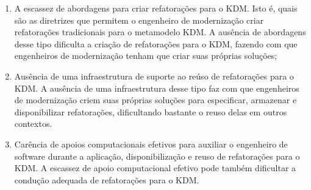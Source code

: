 \begin{enumerate}

\item A escassez de abordagens para criar refatorações para o KDM. Isto é, quais são as diretrizes que permitem o engenheiro de modernização criar refatorações tradicionais para o metamodelo KDM. A ausência de abordagens desse tipo dificulta a criação de refatorações para o KDM, fazendo com que engenheiros de modernização tenham que criar suas próprias soluções;

\item Ausência de uma infraestrutura de suporte ao reúso de refatorações para o KDM. A ausência de uma infraestrutura desse tipo faz com que engenheiros de modernização criem suas próprias soluções para especificar, armazenar e disponibilizar refatorações, dificultando bastante o reuso delas em outros contextos. 






\item Carência de apoios computacionais efetivos para auxiliar o engenheiro de software durante a aplicação, disponibilização e reuso de refatorações para o KDM. A escassez de apoio computacional efetivo pode também dificultar a condução adequada de refatorações para o KDM.

\end{enumerate}




